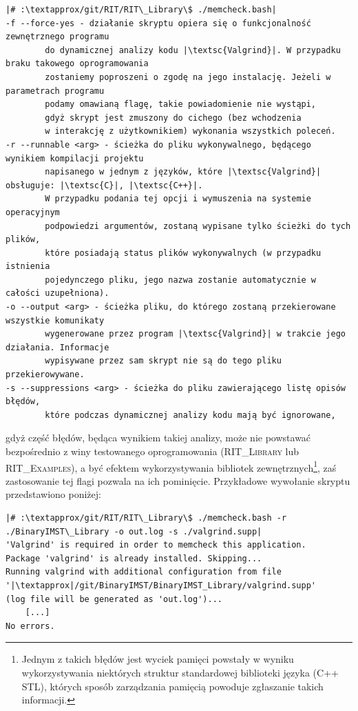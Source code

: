 \begin{verbatim}
|# :\textapprox/git/RIT/RIT\_Library\$ ./memcheck.bash|
-f --force-yes - działanie skryptu opiera się o funkcjonalność zewnętrznego programu 
		do dynamicznej analizy kodu |\textsc{Valgrind}|. W przypadku braku takowego oprogramowania 
		zostaniemy poproszeni o zgodę na jego instalację. Jeżeli w parametrach programu
		podamy omawianą flagę, takie powiadomienie nie wystąpi, 
		gdyż skrypt jest zmuszony do cichego (bez wchodzenia 
		w interakcję z użytkownikiem) wykonania wszystkich poleceń.
-r --runnable <arg> - ścieżka do pliku wykonywalnego, będącego wynikiem kompilacji projektu 
		napisanego w jednym z języków, które |\textsc{Valgrind}| obsługuje: |\textsc{C}|, |\textsc{C++}|. 
		W przypadku podania tej opcji i wymuszenia na systemie operacyjnym 
		podpowiedzi argumentów, zostaną wypisane tylko ścieżki do tych plików, 
		które posiadają status plików wykonywalnych (w przypadku istnienia 
		pojedynczego pliku, jego nazwa zostanie automatycznie w całości uzupełniona).
-o --output <arg> - ścieżka pliku, do którego zostaną przekierowane wszystkie komunikaty 
		wygenerowane przez program |\textsc{Valgrind}| w trakcie jego działania. Informacje
		wypisywane przez sam skrypt nie są do tego pliku przekierowywane.
-s --suppressions <arg> - ścieżka do pliku zawierającego listę opisów błędów, 
		które podczas dynamicznej analizy kodu mają być ignorowane,
\end{verbatim}
gdyż część błędów, będąca wynikiem takiej analizy, może nie powstawać bezpośrednio z winy testowanego oprogramowania (\textsc{RIT\_Library} lub \textsc{RIT\_Examples}), a być efektem wykorzystywania bibliotek zewnętrznych\footnote{Jednym z takich błędów jest wyciek pamięci powstały w wyniku wykorzystywania niektórych struktur standardowej biblioteki języka (\textsc{C++ STL}), których sposób zarządzania pamięcią powoduje zgłaszanie takich informacji.}, zaś zastosowanie tej flagi pozwala na ich pominięcie. Przykładowe wywołanie skryptu przedstawiono poniżej:

\begin{verbatim}
|# :\textapprox/git/RIT/RIT\_Library\$ ./memcheck.bash -r ./BinaryIMST\_Library -o out.log -s ./valgrind.supp|
'Valgrind' is required in order to memcheck this application.
Package 'valgrind' is already installed. Skipping...
Running valgrind with additional configuration from file 
'|\textapprox|/git/BinaryIMST/BinaryIMST_Library/valgrind.supp' 
(log file will be generated as 'out.log')...
	[...]
No errors.
\end{verbatim}

